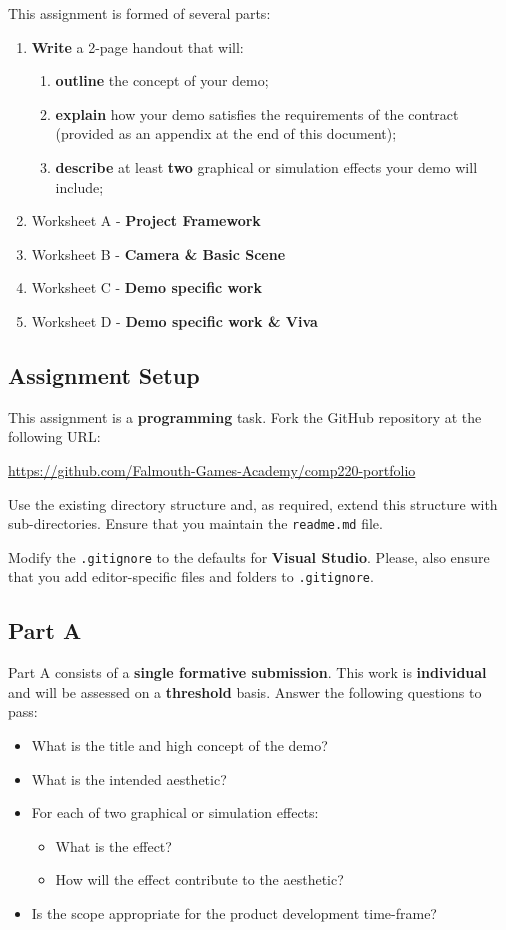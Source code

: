 \documentclass{../../fal_assignment}
\begin{document}
This assignment is formed of several parts:
\begin{enumerate}[label=(\Alph*)]
	\item \textbf{Write} a 2-page handout that will:
		\begin{enumerate}[label=(\roman*)]
			\item \textbf{outline} the concept of your demo;
			\item \textbf{explain} how your demo satisfies the requirements of the contract (provided as an appendix at the end of this document);
			\item \textbf{describe} at least \textbf{two} graphical or simulation effects your demo will include;
		\end{enumerate}
	\item Worksheet A - \textbf{Project Framework}
	\item Worksheet B - \textbf{Camera \& Basic Scene}
	\item Worksheet C - \textbf{Demo specific work}
	\item Worksheet D - \textbf{Demo specific work \& Viva}
\end{enumerate}

\subsection*{Assignment Setup}

This assignment is a \textbf{programming} task. Fork the GitHub repository at the following URL:

\indent \url{https://github.com/Falmouth-Games-Academy/comp220-portfolio}

Use the existing directory structure and, as required, extend this structure with sub-directories.
Ensure that you maintain the \texttt{readme.md} file.

Modify the \texttt{.gitignore} to the defaults for \textbf{Visual Studio}.
Please, also ensure that you add editor-specific files and folders to \texttt{.gitignore}. 

\subsection*{Part A}

Part A consists of a \textbf{single formative submission}. This work is \textbf{individual} and will be assessed on a \textbf{threshold} basis. Answer the following questions to pass:

\begin{itemize}
	\item What is the title and high concept of the demo?
	\item What is the intended aesthetic?
	\item For each of two graphical or simulation effects:
	\begin{itemize}
		\item What is the effect?
		\item How will the effect contribute to the aesthetic?
	\end{itemize}
	\item Is the scope appropriate for the product development time-frame?
\end{itemize}
\end{document}
